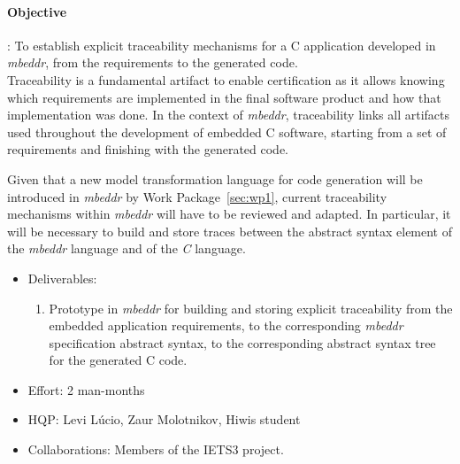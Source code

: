 \paragraph{\textbf{Objective}}: To establish explicit traceability mechanisms
for a C application developed in \emph{mbeddr}, from the requirements to
the generated code.\vspace{.2cm}\\
Traceability is a fundamental artifact to enable certification as it allows
knowing which requirements are implemented in the final software product and how
that implementation was done. In the context of \emph{mbeddr}, traceability links all
artifacts used throughout the development of embedded C software, starting from
a set of requirements and finishing with the generated code. 

Given that a new model transformation language for code generation will be
introduced in \emph{mbeddr} by Work Package~\ref{sec:wp1}, current
traceability mechanisms within \emph{mbeddr} will have to be reviewed and
adapted. In particular, it will be necessary to build and store traces between
the abstract syntax element of the \emph{mbeddr} language and of the \emph{C}
language.


\begin{itemize}
  \item Deliverables:
  \begin{enumerate}
    \item Prototype in \emph{mbeddr} for building and storing explicit traceability
    from the embedded application requirements, to the corresponding \emph{mbeddr}
    specification abstract syntax, to the corresponding abstract syntax tree for
    the generated C code.
  \end{enumerate}
  \item Effort: 2 man-months
  \item HQP: Levi L\'ucio, Zaur Molotnikov, Hiwis student
  \item Collaborations: Members of the IETS3 project.
\end{itemize}
